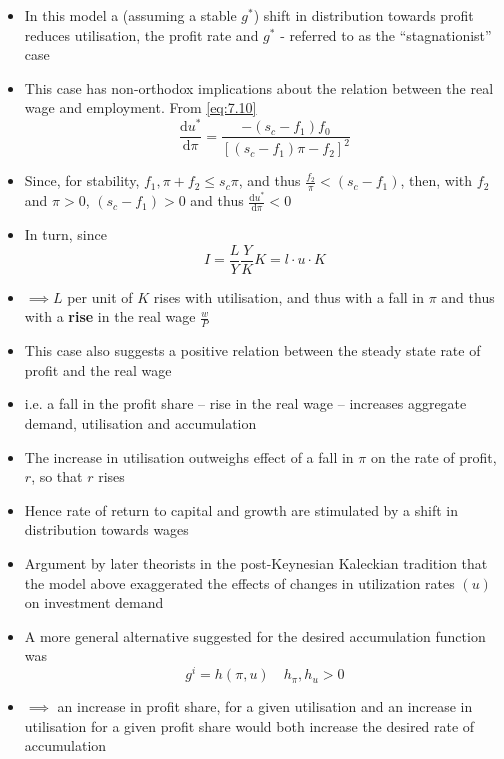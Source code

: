 \documentclass[a4paper,twoside]{article}
\numberwithin{equation}{section}
\numberwithin{figure}{section}
\begin{document}
	\begin{itemize}
		\item In this model a (assuming a stable \( g^* \)) shift in distribution towards profit reduces utilisation, the profit rate and \( g^* \) - referred to as the ``stagnationist'' case
		\item This case has non-orthodox implications about the relation between the real wage and employment. From \cref{eq:7.10}
		\begin{equation}
			\frac{\mathrm{d} u^*}{\mathrm{d} \pi} = \frac{-(s_c-f_1)f_0}{[(s_c-f_1)\pi-f_2]^2} \label{eq:7.11}
		\end{equation}
		\item Since, for stability, \( f_1,\pi + f_2 \leq s_c\pi \), and thus \( \frac{f_2}{\pi} < (s_c-f_1) \), then, with \( f_2 \) and \( \pi > 0 \), \( (s_c-f_1) > 0 \) and thus \( \frac{\mathrm{d} u^*}{\mathrm{d} \pi} < 0 \)
		\item In turn, since
		\begin{equation}
			I = \frac{L}{Y}\frac{Y}{K}K=l\cdot u \cdot K \label{eq:7.12}
		\end{equation}
		\item \( \implies L \)  per unit of \( K \) rises with utilisation, and thus with a fall in \( \pi \) and thus with a \textbf{rise} in the real wage \( \frac{w}{P} \)
		\item This case also suggests a positive relation between the steady state rate of profit and the real wage 
		\item i.e. a fall in the profit share -- rise in the real wage -- increases aggregate demand, utilisation and accumulation
		\item The increase in utilisation outweighs effect of a fall in \( \pi \) on the rate of profit, \( r \),  so that \( r \) rises
		\item Hence rate of return to capital and growth are stimulated by a shift in distribution towards wages
		\item Argument by later theorists in the post-Keynesian Kaleckian tradition that the model above exaggerated the effects of changes in utilization rates \( (u) \) on investment demand
		\item A more general alternative suggested for the desired accumulation function was
		\begin{equation}
			g^i = h(\pi,u) \quad h_{\pi},h_u>0 \label{eq:7.13}
		\end{equation}
		\item \( \implies \) an increase in profit share, for a given utilisation and an increase in utilisation for a given profit share would both increase the desired rate of accumulation

\end{itemize}
\end{document}
